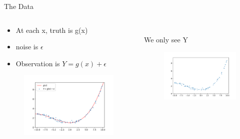 \documentclass[aspectratio=169]{../latex_main/tntbeamer}  %
\begin{document}
	
	\begin{frame}{The Data}
	    \begin{columns}
	        \begin{column}{.4\textwidth}
	                \begin{itemize}
	                    \item At each x, truth is g(x)
	                    \item noise is $\epsilon$
	                    \item Observation is $Y = g(x) + \epsilon$
	                \end{itemize}
	                \begin{figure}
	                    \includegraphics[scale=.4]{Bild1}
	                \end{figure}
	        \end{column}
	        
	        
	         \begin{column}{.4\textwidth}
	         \\ \bigskip
	         \bigskip
	         \bigskip
	         \medskip
	               We only see Y
	                \begin{figure}
	                    \includegraphics[scale=.45]{Bild2}
	                \end{figure}
	        \end{column}
	    \end{columns}
	\end{frame}
	
\end{document}
